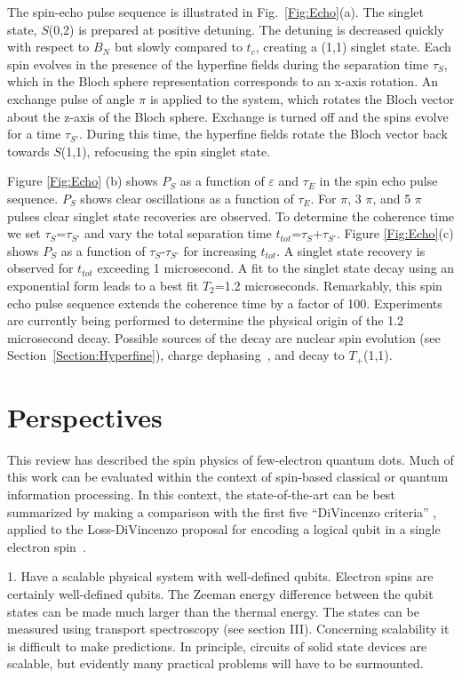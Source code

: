 \documentclass[12pt,aps,nofootinbib]{revtex4-1}
\begin{document}
The spin-echo pulse sequence is illustrated in Fig.~\ref{Fig:Echo}(a). The singlet state, $S$(0,2) is prepared at
positive detuning. The detuning is decreased quickly with respect
to $B_{N}$ but slowly compared to $t_c$, creating a (1,1)
singlet state. Each spin evolves in the presence of the hyperfine
fields during the separation time $\tau_S$, which in the Bloch
sphere representation corresponds to an x-axis rotation. An
exchange pulse of angle $\pi$ is applied to the system, which
rotates the Bloch vector about the z-axis of the Bloch sphere.
Exchange is turned off and the spins evolve for a time
$\tau_{S'}$. During this time, the hyperfine fields rotate the
Bloch vector back towards $S$(1,1), refocusing the spin singlet
state.

Figure \ref{Fig:Echo} (b) shows $P_S$ as a function of $\varepsilon$
and $\tau_E$ in the spin echo pulse sequence. $P_S$ shows clear
oscillations as a function of $\tau_E$. For $\pi$, 3 $\pi$, and 5
$\pi$ pulses clear singlet state recoveries are observed. To
determine the coherence time we set $\tau_S$=$\tau_{S'}$ and vary
the total separation time $t_{tot}$=$\tau_S$+$\tau_{S'}$. Figure
\ref{Fig:Echo}(c) shows $P_S$ as a function of $\tau_S$-$\tau_{S'}$ for
increasing $t_{tot}$. A singlet state recovery is observed for
$t_{tot}$ exceeding 1 microsecond. A fit to the singlet state
decay using an exponential form leads to a best fit $T_2$=1.2
microseconds. Remarkably, this spin echo pulse sequence extends
the coherence time by a factor of 100. Experiments are currently
being performed to determine the physical origin of the 1.2
microsecond decay. Possible sources of the decay are nuclear spin
evolution (see Section~\ref{Section:Hyperfine}), charge dephasing~\cite{Hu06}, and decay to $T_+$(1,1).

\section{Perspectives}

This review has described the spin physics of few-electron quantum dots. Much of this work can be evaluated within the context of spin-based classical or quantum information processing. In this context, the state-of-the-art can be best summarized by making a comparison with the first five ``DiVincenzo criteria'' \cite{DiVincenzo_criteria}, applied to the Loss-DiVincenzo proposal for encoding a logical qubit in a single electron spin~\cite{LossDiVincenzo}.

1. Have a scalable
physical system with well-defined qubits. Electron spins are
certainly well-defined qubits. The Zeeman energy difference
between the qubit states can be made much larger than the thermal
energy. The states can be measured using transport spectroscopy
(see section III). Concerning scalability it is difficult to make
predictions. In principle, circuits of solid state devices are
scalable, but evidently many practical problems will have to be surmounted.
\end{document}
